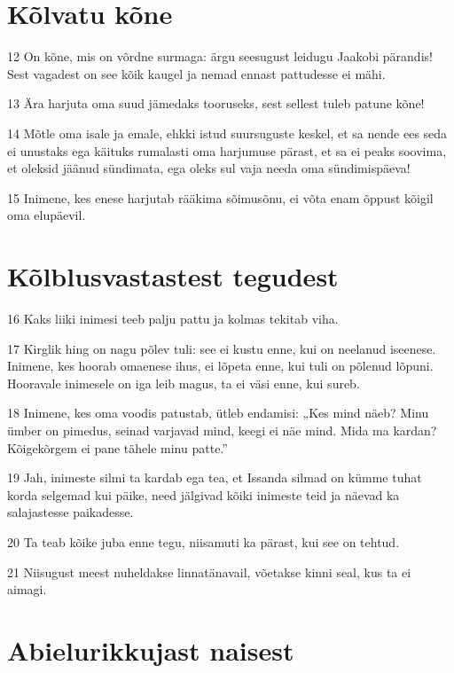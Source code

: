 \section*{Kõlvatu kõne}

\par 12 On kõne, mis on võrdne surmaga: ärgu seesugust leidugu Jaakobi pärandis! Sest vagadest on see kõik kaugel ja nemad ennast pattudesse ei mähi.
\par 13 Ära harjuta oma suud jämedaks tooruseks, sest sellest tuleb patune kõne!
\par 14 Mõtle oma isale ja emale, ehkki istud suursuguste keskel, et sa nende ees seda ei unustaks ega käituks rumalasti oma harjumuse pärast, et sa ei peaks soovima, et oleksid jäänud sündimata, ega oleks sul vaja needa oma sündimispäeva!
\par 15 Inimene, kes enese harjutab rääkima sõimusõnu, ei võta enam õppust kõigil oma elupäevil.

\section*{Kõlblusvastastest tegudest}

\par 16 Kaks liiki inimesi teeb palju pattu ja kolmas tekitab viha.
\par 17 Kirglik hing on nagu põlev tuli: see ei kustu enne, kui on neelanud iseenese. Inimene, kes hoorab omaenese ihus, ei lõpeta enne, kui tuli on põlenud lõpuni. Hooravale inimesele on iga leib magus, ta ei väsi enne, kui sureb.
\par 18 Inimene, kes oma voodis patustab, ütleb endamisi: „Kes mind näeb? Minu ümber on pimedus, seinad varjavad mind, keegi ei näe mind. Mida ma kardan? Kõigekõrgem ei pane tähele minu patte.”
\par 19 Jah, inimeste silmi ta kardab ega tea, et Issanda silmad on kümme tuhat korda selgemad kui päike, need jälgivad kõiki inimeste teid ja näevad ka salajastesse paikadesse.
\par 20 Ta teab kõike juba enne tegu, niisamuti ka pärast, kui see on tehtud.
\par 21 Niisugust meest nuheldakse linnatänavail, võetakse kinni seal, kus ta ei aimagi.

\section*{Abielurikkujast naisest}

